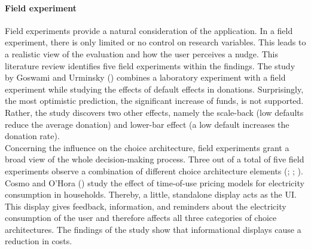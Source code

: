 \paragraph{Field experiment}
Field experiments provide a natural consideration of the application. In a field experiment, there is only limited or no control on research variables. This leads to a realistic view of the evaluation and how the user perceives a nudge. This literature review identifies five field experiments within the findings. The study by Goswami and Urminsky (\citeyear{goswami_when_2016}) combines a laboratory experiment with a field experiment while studying the effects of default effects in donations. Surprisingly, the most optimistic prediction, the significant increase of funds, is not supported. Rather, the study discovers two other effects, namely the scale-back (low defaults reduce the average donation) and lower-bar effect (a low default increases the donation rate).
\\
 
Concerning the influence on the choice architecture, field experiments grant a broad view of the whole decision-making process. Three out of a total of five field experiments observe a combination of different choice architecture elements (\cite{miller_effects_2016}; \cite{cosmo_nudging_2017}; \cite{mazar_if_2018}). Cosmo and O'Hora (\citeyear{cosmo_nudging_2017}) study the effect of time-of-use pricing models for electricity consumption in households. Thereby, a little, standalone display acts as the UI. This display gives feedback, information, and reminders about the electricity consumption of the user and therefore affects all three categories of choice architectures. The findings of the study show that informational displays cause a reduction in costs.


